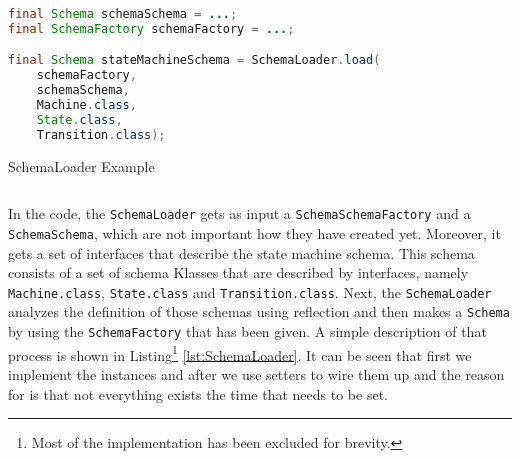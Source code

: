 \begin{sourcecode} [H]
	\begin{lstlisting}[language=Java, escapechar=|]
final Schema schemaSchema = ...;
final SchemaFactory schemaFactory = ...;

final Schema stateMachineSchema = SchemaLoader.load(
	schemaFactory, 
	schemaSchema, 
	Machine.class, 
	State.class, 
	Transition.class);
	\end{lstlisting}
	\caption{SchemaLoader Example}
	\label{lst:SchemaLoader Example}
\end{sourcecode}

In the code, the \texttt{SchemaLoader} gets as input a \texttt{SchemaSchemaFactory} and a \texttt{SchemaSchema}, which are not important how they have created yet.
Moreover, it gets a set of interfaces that describe the state machine schema.
This schema consists of a set of schema Klasses that are described by interfaces, namely \texttt{Machine.class}, \texttt{State.class} and \texttt{Transition.class}.
Next, the \texttt{SchemaLoader} analyzes the definition of those schemas using reflection and then makes a \texttt{Schema} by using the \texttt{SchemaFactory} that has been given.
A simple description of that process is shown in Listing\footnote{
	Most of the implementation has been excluded for brevity.} \ref{lst:SchemaLoader}.
It can be seen that first we implement the instances and after we use setters to wire them up and the reason for is that not everything exists the time that needs to be set.

